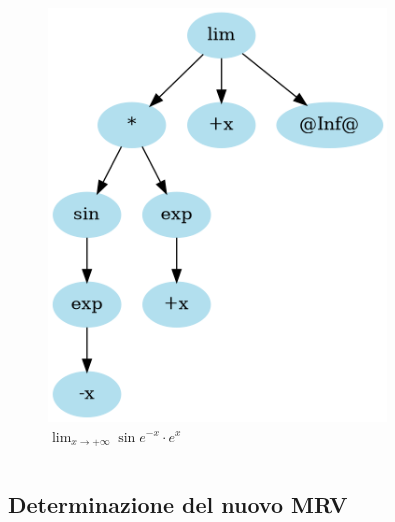 \documentclass[aspectratio=149]{beamer}
\begin{document}
\begin{frame}
\begin{columns}
			\begin{column}{0.45\textwidth}
				\begin{figure}
					\includegraphics[width=0.8\textwidth]{pres_img/simplified2.png}
					\caption{\(\lim_{x \to +\infty}{\sin{e^{-x}} \cdot e^{x}}\)}
				\end{figure}
			\end{column}
		\end{columns}
	\end{frame}

	\subsection{Determinazione del nuovo MRV}
	
\end{document}
